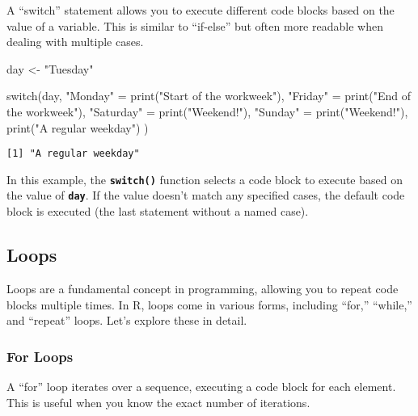 \documentclass[
  letterpaper,
  DIV=11,
  numbers=noendperiod]{scrartcl}
\newenvironment{Shaded}{\begin{snugshade}}{\end{snugshade}}
\newcommand{\ControlFlowTok}[1]{\textcolor[rgb]{0.00,0.23,0.31}{#1}}
\newcommand{\FunctionTok}[1]{\textcolor[rgb]{0.28,0.35,0.67}{#1}}
\newcommand{\NormalTok}[1]{\textcolor[rgb]{0.00,0.23,0.31}{#1}}
\newcommand{\OtherTok}[1]{\textcolor[rgb]{0.00,0.23,0.31}{#1}}
\newcommand{\StringTok}[1]{\textcolor[rgb]{0.13,0.47,0.30}{#1}}
\begin{document}
A ``switch'' statement allows you to execute different code blocks based
on the value of a variable. This is similar to ``if-else'' but often
more readable when dealing with multiple cases.

\begin{Shaded}
\begin{Highlighting}[]
\NormalTok{day }\OtherTok{\textless{}{-}} \StringTok{"Tuesday"}

\ControlFlowTok{switch}\NormalTok{(day,}
  \StringTok{"Monday"} \OtherTok{=} \FunctionTok{print}\NormalTok{(}\StringTok{"Start of the workweek"}\NormalTok{),}
  \StringTok{"Friday"} \OtherTok{=} \FunctionTok{print}\NormalTok{(}\StringTok{"End of the workweek"}\NormalTok{),}
  \StringTok{"Saturday"} \OtherTok{=} \FunctionTok{print}\NormalTok{(}\StringTok{"Weekend!"}\NormalTok{),}
  \StringTok{"Sunday"} \OtherTok{=} \FunctionTok{print}\NormalTok{(}\StringTok{"Weekend!"}\NormalTok{),}
  \FunctionTok{print}\NormalTok{(}\StringTok{"A regular weekday"}\NormalTok{)}
\NormalTok{)}
\end{Highlighting}
\end{Shaded}

\begin{verbatim}
[1] "A regular weekday"
\end{verbatim}

In this example, the \textbf{\texttt{switch()}} function selects a code
block to execute based on the value of \textbf{\texttt{day}}. If the
value doesn't match any specified cases, the default code block is
executed (the last statement without a named case).

\hypertarget{loops}{%
\subsection{Loops}\label{loops}}

Loops are a fundamental concept in programming, allowing you to repeat
code blocks multiple times. In R, loops come in various forms, including
``for,'' ``while,'' and ``repeat'' loops. Let's explore these in detail.

\hypertarget{for-loops}{%
\subsubsection{For Loops}\label{for-loops}}

A ``for'' loop iterates over a sequence, executing a code block for each
element. This is useful when you know the exact number of iterations.
\end{document}
